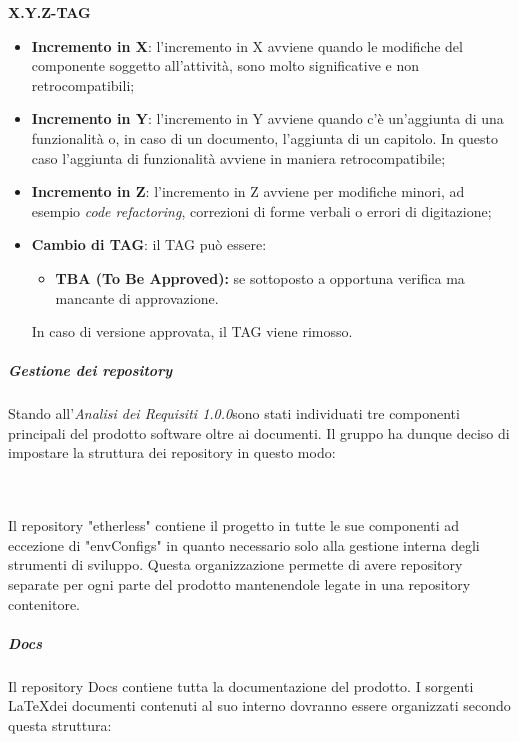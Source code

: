 \centerline{\textbf{X.Y.Z-TAG}}


\begin{itemize}
  \item \textbf{Incremento in X}: l'incremento in X avviene quando le modifiche del componente soggetto all'attività, sono molto significative e non retrocompatibili;
  \item \textbf{Incremento in Y}: l'incremento in Y avviene quando c'è un'aggiunta
  di una funzionalità o, in caso di un documento, l'aggiunta di un capitolo. In questo caso l'aggiunta di funzionalità avviene in maniera retrocompatibile;
  \item \textbf{Incremento in Z}: l'incremento in Z avviene per modifiche minori,
  ad esempio \textit{code refactoring\glos}, correzioni di forme verbali o errori di digitazione;
  \item \textbf{Cambio di TAG}: il TAG può essere:
  \begin{itemize}
  	\item \textbf{TBA (To Be Approved):} se sottoposto a opportuna verifica ma mancante di approvazione.
  \end{itemize}
  In caso di versione approvata, il TAG viene rimosso.
\end{itemize}


\subparagraph*{Gestione dei repository}
Stando all'\textit{Analisi dei Requisiti 1.0.0}\doc sono stati individuati
tre componenti principali del prodotto software oltre ai documenti.
Il gruppo ha dunque deciso di impostare la struttura dei repository in questo modo:\\\\

\vspace{1cm}

\noindent \\Il repository "etherless" contiene il progetto in tutte le sue componenti
ad eccezione di "envConfigs" in quanto necessario solo alla gestione interna
degli strumenti di sviluppo. Questa organizzazione permette di avere repository separate per ogni parte
del prodotto mantenendole legate in una repository contenitore.

\subparagraph*{Docs}
Il repository Docs contiene tutta la documentazione del prodotto. I sorgenti \LaTeX \space dei documenti contenuti al suo interno dovranno essere organizzati secondo questa struttura:\\\\

